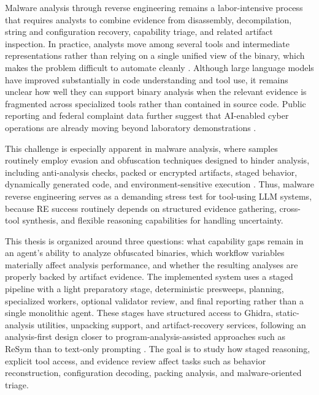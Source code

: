 \abstract

Malware analysis through reverse engineering remains a labor-intensive process that requires analysts to combine evidence from disassembly, decompilation, string and configuration recovery, capability triage, and related artifact inspection. In practice, analysts move among several tools and intermediate representations rather than relying on a single unified view of the binary, which makes the problem difficult to automate cleanly \cite{kunwar2024sok,mattei2022reusability,yakdan2016johnny}. Although large language models have improved substantially in code understanding and tool use, it remains unclear how well they can support binary analysis when the relevant evidence is fragmented across specialized tools rather than contained in source code. Public reporting and federal complaint data further suggest that AI-enabled cyber operations are already moving beyond laboratory demonstrations \cite{anthropic2025espionage,fbi2025ic3}.

This challenge is especially apparent in malware analysis, where samples routinely employ evasion and obfuscation techniques designed to hinder analysis, including anti-analysis checks, packed or encrypted artifacts, staged behavior, dynamically generated code, and environment-sensitive execution \cite{kunwar2024sok,raitsis2025obfuscation}. Thus, malware reverse engineering serves as a demanding stress test for tool-using LLM systems, because RE success routinely depends on structured evidence gathering, cross-tool synthesis, and flexible reasoning capabilities for handling uncertainty.

This thesis is organized around three questions: what capability gaps remain in an agent's ability to analyze obfuscated binaries, which workflow variables materially affect analysis performance, and whether the resulting analyses are properly backed by artifact evidence. The implemented system uses a staged pipeline with a light preparatory stage, deterministic presweeps, planning, specialized workers, optional validator review, and final reporting rather than a single monolithic agent. These stages have structured access to Ghidra, static-analysis utilities, unpacking support, and artifact-recovery services, following an analysis-first design closer to program-analysis-assisted approaches such as ReSym than to text-only prompting \cite{ghidramcp2025,ghidraplugin2025,xie2024resym}. The goal is to study how staged reasoning, explicit tool access, and evidence review affect tasks such as behavior reconstruction, configuration decoding, packing analysis, and malware-oriented triage.

